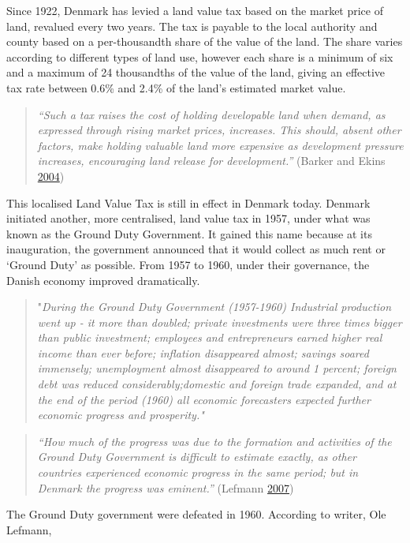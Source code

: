 \documentclass[]{tufte-handout}
\begin{document}
Since 1922, Denmark has levied a land value tax based on the market
price of land, revalued every two years. The tax is payable to the local
authority and county based on a per-thousandth share of the value of the
land. The share varies according to different types of land use, however
each share is a minimum of six and a maximum of 24 thousandths of the
value of the land, giving an effective tax rate between 0.6\% and 2.4\%
of the land's estimated market value.

\begin{quote}
\emph{``Such a tax raises the cost of holding developable land when
demand, as expressed through rising market prices, increases. This
should, absent other factors, make holding valuable land more expensive
as development pressure increases, encouraging land release for
development.''} (Barker and Ekins
\protect\hyperlink{ref-Barker2004}{2004})
\end{quote}

This localised Land Value Tax is still in effect in Denmark today.
Denmark initiated another, more centralised, land value tax in 1957,
under what was known as the Ground Duty Government. It gained this name
because at its inauguration, the government announced that it would
collect as much rent or `Ground Duty' as possible. From 1957 to 1960,
under their governance, the Danish economy improved dramatically.

\begin{quote}
"\emph{During the Ground Duty Government (1957-1960) Industrial
production went up - it more than doubled; private investments were
three times bigger than public investment; employees and entrepreneurs
earned higher real income than ever before; inflation disappeared
almost; savings soared immensely; unemployment almost disappeared to
around 1 percent; foreign debt was reduced considerably;domestic and
foreign trade expanded, and at the end of the period (1960) all economic
forecasters expected further economic progress and prosperity."}
\end{quote}

\begin{quote}
\emph{``How much of the progress was due to the formation and activities
of the Ground Duty Government is difficult to estimate exactly, as other
countries experienced economic progress in the same period; but in
Denmark the progress was eminent.''} (Lefmann
\protect\hyperlink{ref-Lefmann2007}{2007})
\end{quote}

The Ground Duty government were defeated in 1960. According to writer,
Ole Lefmann,
\end{document}
